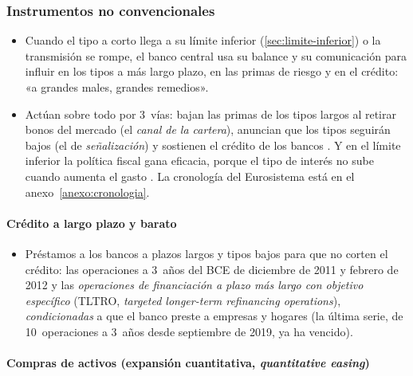 \documentclass[11pt]{article}
\begin{document}
\subsubsection{Instrumentos no convencionales}\label{sec:no-convencionales}

\begin{itemize}
\item Cuando el tipo a corto llega a su límite inferior (\ref{sec:limite-inferior}) o la transmisión se rompe, el banco central usa su balance y su comunicación para influir en los tipos a más largo plazo, en las primas de riesgo y en el crédito: «a grandes males, grandes remedios».
\item Actúan sobre todo por 3~vías: bajan las primas de los tipos largos al retirar bonos del mercado (el \emph{canal de la cartera}), anuncian que los tipos seguirán bajos (el de \emph{señalización}) y sostienen el crédito de los bancos . Y en el límite inferior la política fiscal gana eficacia, porque el tipo de interés no sube cuando aumenta el gasto . La cronología del Eurosistema está en el anexo~\ref{anexo:cronologia}.
\end{itemize}

\paragraph{Crédito a largo plazo y barato}

\begin{itemize}
\item Préstamos a los bancos a plazos largos y tipos bajos para que no corten el crédito: las operaciones a 3~años del BCE de diciembre de 2011 y febrero de 2012 y las \emph{operaciones de financiación a plazo más largo con objetivo específico} (TLTRO, \emph{targeted longer-term refinancing operations}), \emph{condicionadas} a que el banco preste a empresas y hogares (la última serie, de 10~operaciones a 3~años desde septiembre de 2019, ya ha vencido)\nocite{BieberLizarazo2026Liquidez}.
\end{itemize}

\paragraph{Compras de activos (expansión cuantitativa, \emph{quantitative easing})}
\end{document}
